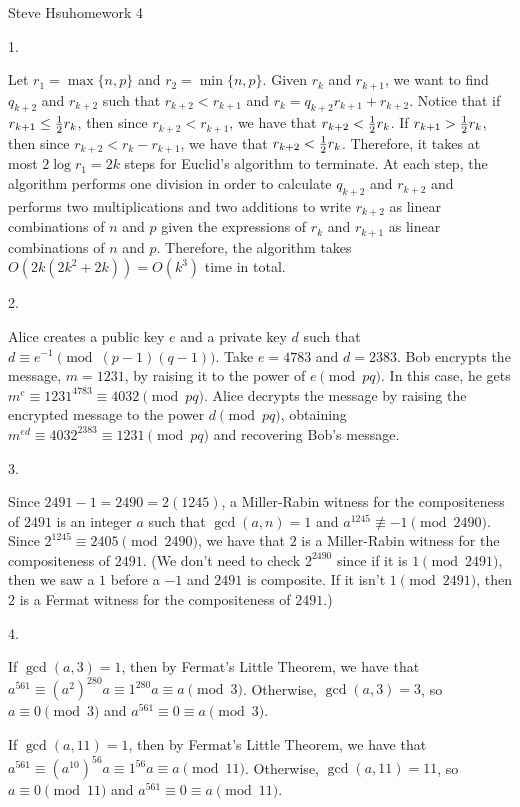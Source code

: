 \centerline{Steve Hsu\hfill homework 4}
\item{1.}

Let $r_1 = \max \{n, p\}$ and $r_2 = \min \{n, p\}$.
Given $r_k$ and $r_{k+1}$, we want to find $q_{k+2}$ and $r_{k+2}$ such that
$r_{k+2} < r_{k+1}$ and $r_k = q_{k+2} r_{k+1} + r_{k+2}$.
Notice that if $r_{k+1} \le {1 \over 2} r_k$, then since $r_{k+2} < r_{k+1}$,
we have that $r_{k+2} < {1 \over 2} r_k$.
If $r_{k+1} > {1 \over 2} r_k$, then since $r_{k+2} < r_k - r_{k+1}$,
we have that $r_{k+2} < {1 \over 2} r_k$.
Therefore, it takes at most $2 \log r_1 = 2k$ steps
for Euclid's algorithm to terminate.
At each step, the algorithm performs one division
in order to calculate $q_{k+2}$ and $r_{k+2}$
and performs two multiplications and two additions to write
$r_{k+2}$ as linear combinations of $n$ and $p$ given the expressions of
$r_k$ and $r_{k+1}$ as linear combinations of $n$ and $p$.
Therefore, the algorithm takes $O(2k(2k^2 + 2k)) = O(k^3)$ time in total.
\bigskip
\item{2.}

Alice creates a public key $e$ and a private key $d$
such that $d \equiv e^{-1} \pmod{(p - 1)(q - 1)}$.
Take $e = 4783$ and $d = 2383$.
Bob encrypts the message, $m = 1231$,
by raising it to the power of $e \pmod{pq}$.
In this case, he gets $m^e \equiv 1231^{4783} \equiv 4032 \pmod{pq}$.
Alice decrypts the message by raising the encrypted message
to the power $d \pmod{pq}$,
obtaining $m^{ed} \equiv 4032^{2383} \equiv 1231 \pmod{pq}$
and recovering Bob's message.
\bigskip
\item{3.}

Since $2491 - 1 = 2490 = 2(1245)$,
a Miller-Rabin witness for the compositeness of $2491$
is an integer $a$ such that $\gcd (a, n) = 1$ and
$a^{1245} \not\equiv -1 \pmod{2490}$.
Since $2^{1245} \equiv 2405 \pmod{2490}$,
we have that $2$ is a Miller-Rabin witness for the compositeness of $2491$.
(We don't need to check $2^{2490}$ since if it is $1 \pmod{2491}$,
then we saw a $1$ before a $-1$ and $2491$ is composite.
If it isn't $1 \pmod{2491}$, then $2$ is a Fermat witness for
the compositeness of $2491$.)
\bigskip
\item{4.}

If $\gcd (a, 3) = 1$, then by Fermat's Little Theorem,
we have that $a^{561} \equiv (a^{2})^{280} a \equiv 1^{280} a \equiv a \pmod 3$.
Otherwise, $\gcd (a, 3) = 3$, so $a \equiv 0 \pmod 3$ and
$a^{561} \equiv 0 \equiv a \pmod 3$.

If $\gcd (a, 11) = 1$, then by Fermat's Little Theorem,
we have that $a^{561} \equiv (a^{10})^{56} a \equiv 1^{56} a \equiv a \pmod{11}$.
Otherwise, $\gcd (a, 11) = 11$, so $a \equiv 0 \pmod{11}$ and
$a^{561} \equiv 0 \equiv a \pmod{11}$.

